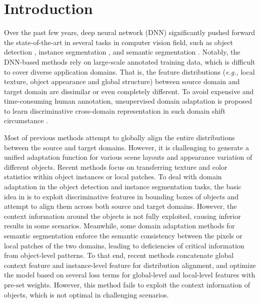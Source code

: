 \documentclass[runningheads]{llncs}
\def\eg{{\em e.g.}}
\begin{document}
\section{Introduction}
Over the past few years, deep neural network (DNN) significantly pushed forward the state-of-the-art in several tasks in computer vision field, such as object detection \cite{DBLP:journals/pami/RenHG017,DBLP:conf/cvpr/ZhangWBLL18}, instance segmentation \cite{DBLP:conf/iccv/HeGDG17,DBLP:conf/cvpr/HayderHS17}, and semantic segmentation \cite{DBLP:conf/cvpr/LongSD15,DBLP:journals/corr/ChenPSA17}. Notably, the DNN-based methods rely on large-scale annotated training data, which is difficult to cover diverse application domains. That is, the feature distributions (\eg, local texture, object appearance and global structure) between source domain and target domain are dissimilar or even completely different. To avoid expensive and time-consuming human annotation, unsupervised domain adaptation is proposed to learn discriminative cross-domain representation in such domain shift circumstance \cite{quinonero2008covariate}.

Most of previous methods \cite{DBLP:journals/corr/HoffmanWYD16,DBLP:conf/nips/LiuBK17,DBLP:conf/icml/HoffmanTPZISED18} attempt to globally align the entire distributions between the source and target domains. However, it is challenging to generate a unified adaptation function for various scene layouts and appearance variation of different objects. Recent methods focus on transferring texture and color statistics within object instances or local patches. To deal with domain adaptation in the object detection and instance segmentation tasks, the basic idea in \cite{DBLP:conf/cvpr/Chen0SDG18,DBLP:conf/cvpr/ZhuPYSL19} is to exploit discriminative features in bounding boxes of objects and attempt to align them across both source and target domains. However, the context information around the objects is not fully exploited, causing inferior results in some scenarios. Meanwhile, some domain adaptation methods for semantic segmentation \cite{DBLP:journals/corr/abs-1901-05427,DBLP:conf/cvpr/Luo0GYY19} enforce the semantic consistency between the pixels or local patches of the two domains, leading to deficiencies of critical information from object-level patterns. To that end, recent methods \cite{DBLP:conf/cvpr/SaitoUHS19,DBLP:journals/corr/abs-1911-02559} concatenate global context feature and instance-level feature for distribution alignment, and optimize the model based on several loss terms for global-level and local-level features with pre-set weights. However, this method fails to exploit the context information of objects, which is not optimal in challenging scenarios.
\end{document}
